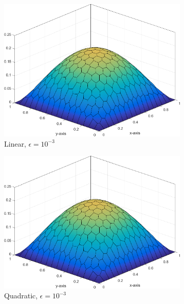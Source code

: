 \begin{figure}
{	\begin{subfigure}[b]{0.465\textwidth}
		\centering
		\label{subfig::DL_trans_me1_e3}
		\includegraphics[width=\textwidth]{figures/sec_BF/Sq_poly_MAXENT_k=1_ep=1e-3.png}
		\caption{Linear, $\epsilon = 10^{-3}$}
	\end{subfigure}
	\hfill
	\begin{subfigure}[b]{0.465\textwidth}
		\centering
		\label{subfig::DL_trans_me2_e3}
		\includegraphics[width=\textwidth]{figures/sec_BF/Sq_poly_MAXENT_k=2_ep=1e-3.png}
		\caption{Quadratic, $\epsilon = 10^{-3}$}
	\end{subfigure}
}
{
	\vspace{3mm}
	\begin{subfigure}[b]{0.465\textwidth}

\end{subfigure}}
\end{figure}
